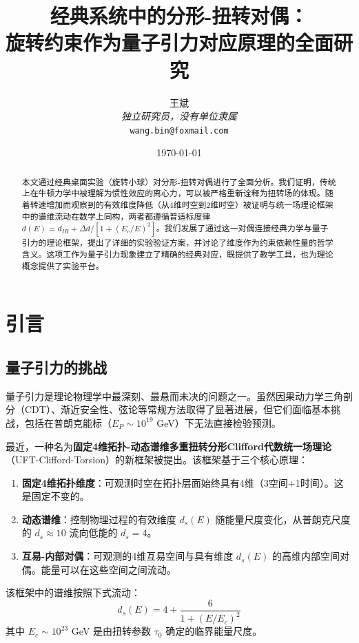 \documentclass[12pt,a4paper]{article}
\title{\textbf{经典系统中的分形-扭转对偶：}\\
\textbf{旋转约束作为量子引力对应原理的全面研究}}\\
\author{王斌\\
\textit{独立研究员，没有单位隶属}\\
\texttt{wang.bin@foxmail.com}}
\date{\today}
\begin{document}
\maketitle

\begin{abstract}
本文通过经典桌面实验（旋转小球）对分形-扭转对偶进行了全面分析。我们证明，传统上在牛顿力学中被理解为惯性效应的离心力，可以被严格重新诠释为扭转场的体现。随着转速增加而观察到的有效维度降低（从4维时空到2维时空）被证明与统一场理论框架中的谱维流动在数学上同构，两者都遵循普适标度律 $d(E) = d_{IR} + \Delta d/[1+(E_c/E)^2]$。我们发展了通过这一对偶连接经典力学与量子引力的理论框架，提出了详细的实验验证方案，并讨论了维度作为约束依赖性量的哲学含义。这项工作为量子引力现象建立了精确的经典对应，既提供了教学工具，也为理论概念提供了实验平台。
\end{abstract}

\tableofcontents
\newpage

\section{引言}
\label{sec:intro}

\subsection{量子引力的挑战}

量子引力是理论物理学中最深刻、最悬而未决的问题之一。虽然因果动力学三角剖分（CDT）、渐近安全性、弦论等常规方法取得了显著进展，但它们面临基本挑战，包括在普朗克能标（$E_P \sim 10^{19}$ GeV）下无法直接检验预测。

最近，一种名为\textbf{固定4维拓扑-动态谱维多重扭转分形Clifford代数统一场理论}（UFT-Clifford-Torsion）的新框架被提出。该框架基于三个核心原理：

\begin{enumerate}
    \item \textbf{固定4维拓扑维度}：可观测时空在拓扑层面始终具有4维（3空间+1时间）。这是固定不变的。
    \item \textbf{动态谱维}：控制物理过程的有效维度 $d_s(E)$ 随能量尺度变化，从普朗克尺度的 $d_s \approx 10$ 流向低能的 $d_s = 4$。
    \item \textbf{互易-内部对偶}：可观测的4维互易空间与具有维度 $d_s(E)$ 的高维内部空间对偶。能量可以在这些空间之间流动。
\end{enumerate}

该框架中的谱维按照下式流动：
\begin{equation}
    d_s(E) = 4 + \frac{6}{1+(E/E_c)^2}
\end{equation}
其中 $E_c \sim 10^{23}$ GeV 是由扭转参数 $\tau_0$ 确定的临界能量尺度。
\end{document}
